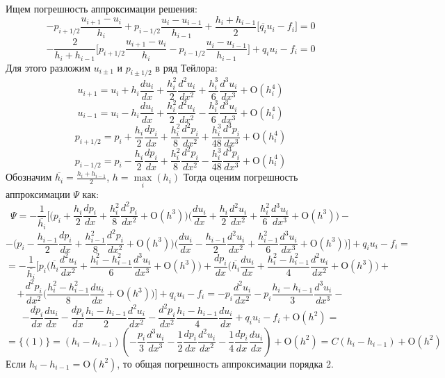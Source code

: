 \documentclass[12pt]{article}
\begin{document}
Ищем погрешность аппроксимации решения:
\[
-p_{i+1/2}\frac{u_{i+1}-u_i}{h_i}+p_{i-1/2}\frac{u_i-u_{i-1}}{h_{i-1}} + \frac{h_i+h_{i-1}}{2}\big[\overline{q_i}u_i-f_i\big]=0
\]
\[
-\frac{2}{h_i+h_{i-1}}\bigg[p_{i+1/2}\frac{u_{i+1}-u_i}{h_i} - p_{i-1/2}\frac{u_i-u_{i-1}}{h_{i-1}}\bigg]+q_iu_i-f_i=0
\]
Для этого разложим $u_{i\pm 1}$ и $p_{i\pm 1/2}$ в ряд Тейлора:
\[
u_{i + 1} = u_i+h_i\frac{du_i}{dx} + \frac{h_i^2}{2} \frac{d^2u_i}{dx^2} +  \frac{h_i^3}{6} \frac{d^3u_i}{dx^3} + \mathrm{O}(h_i^4)
\]
\[
u_{i - 1} = u_i-h_i\frac{du_i}{dx} + \frac{h_i^2}{2} \frac{d^2u_i}{dx^2} - \frac{h_i^3}{6} \frac{d^3u_i}{dx^3} + \mathrm{O}(h_i^4)
\]
\[
p_{i + 1/2} = p_i+\frac{h_i}{2}\frac{dp_i}{dx} + \frac{h_i^2}{8} \frac{d^2p_i}{dx^2} +  \frac{h_i^3}{48} \frac{d^3p_i}{dx^3} + \mathrm{O}(h_i^4)
\]
\[
p_{i - 1/2} = p_i-\frac{h_i}{2}\frac{dp_i}{dx} + \frac{h_i^2}{8} \frac{d^2p_i}{dx^2} - \frac{h_i^3}{48} \frac{d^3p_i}{dx^3} + \mathrm{O}(h_i^4)
\]
Обозначим $\overline{h_i} = \frac{h_i+h_{i-1}}{2}$, $h=\max\limits_{i}(h_i)$ 
Тогда оценим погрешность аппроксимации $\Psi$ как:
\[
\Psi = -\frac{1}{\overline{h_i}}\bigg[\big( p_i+\frac{h_i}{2}\frac{dp_i}{dx} + \frac{h_i^2}{8} \frac{d^2p_i}{dx^2} + \mathrm{O}(h^3)\big) \big(\frac{du_i}{dx}+\frac{h_i}{2}\frac{d^2u_i}{dx^2} +\frac{h_i^2}{6}\frac{d^3u_i}{dx^3} + \mathrm{O}(h^3)\big) - 
\]
\[
- \big( p_i-\frac{h_{i-1}}{2}\frac{dp_i}{dx} + \frac{h_{i-1}^2}{8} \frac{d^2p_i}{dx^2} + \mathrm{O}(h^3) \big) \big( \frac{du_i}{dx}-\frac{h_{i-1}}{2}\frac{d^2u_i}{dx^2} +\frac{h_{i-1}^2}{6}\frac{d^3u_i}{dx^3} + \mathrm{O}(h^3)\big)\bigg] + q_iu_i-f_i =
\]
\[
= -\frac{1}{\overline{h_i}}\bigg[ p_i\big(\overline{h_i}\frac{d^2u_i}{dx^2} + \frac{h_i^2-h_{i-1}^2}{6} \frac{d^3u_i}{dx^3} + \mathrm{O}(h^3)\big) + \frac{dp_i}{dx}\big( \overline{h_i}\frac{du_i}{dx} + \frac{h_i^2-h_{i-1}^2}{4} \frac{d^2u_i}{dx^2} + \mathrm{O}(h^3)\big) +
\]
\[
+ \frac{d^2p_i}{dx^2}\big( \frac{h_i^2-h_{i-1}^2}{8}\frac{du_i}{dx} + \mathrm{O}(h^3)\big)\bigg]+ q_iu_i - f_i = -p_i\frac{d^2u_i}{dx^2}-p_i\frac{h_i-h_{i-1}}{3}\frac{d^3u_i}{dx^3} -
\]
\[
- \frac{dp_i}{dx} \frac{du_i}{dx} -\frac{dp_i}{dx}\frac{h_i-h_{i-1}}{2} \frac{d^2u_i}{dx^2} - \frac{d^2p_i}{dx^2} \frac{h_i-h_{i-1}}{4} \frac{du_i}{dx} +q_iu_i -f_i+ \mathrm{O}(h^2) =
\]
\[
= \{(1)\} = (h_i-h_{i-1})(-\frac{p_i}{3}\frac{d^3u_i}{dx^3} - \frac{1}{2} \frac{dp_i}{dx} \frac{d^2u_i}{dx^2} - \frac{1}{4} \frac{dp_i}{dx} \frac{du_i}{dx}) + \mathrm{O}(h^2) = C(h_i-h_{i-1}) + \mathrm{O}(h^2)
\]
Если $h_i-h_{i-1} = \mathrm{O}(h^2)$, то общая погрешность аппроксимации порядка 2.
\end{document}
